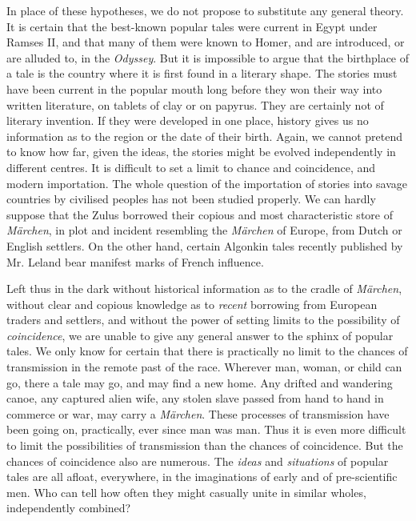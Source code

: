 \documentclass[14pt,a4paper]{memoir}
\begin{document}
In place of these hypotheses, we do not propose to substitute any
general theory. It is certain that the best-known popular tales were
current in Egypt under Ramses II, and that many of them were known to
Homer, and are introduced, or are alluded to, in the \emph{Odyssey}. But
it is impossible to argue that the birthplace of a tale is the country
where it is first found in a literary shape. The stories must have been
current in the popular mouth long before they won their way into written
literature, on tablets of clay or on papyrus. They are certainly not of
literary invention. If they were developed in one place, history gives
us no information as to the region or the date of their birth. Again, we
cannot pretend to know how far, given the ideas, the stories might be
evolved independently in different centres. It is difficult to set a
limit to chance and coincidence, and modern importation. The whole
question of the importation of stories into savage countries by
civilised peoples has not been studied properly. We can hardly suppose
that the Zulus borrowed their copious and most characteristic store of
\emph{Märchen}, in plot and incident resembling the \emph{Märchen} of
Europe, from Dutch or English settlers. On the other hand, certain
Algonkin tales recently published by Mr. Leland bear manifest marks of
French influence.

Left thus in the dark without historical information as to the
\textquotesingle cradle\textquotesingle{} of \emph{Märchen}, without
clear and copious knowledge as to \emph{recent} borrowing from European
traders and settlers, and without the power of setting limits to the
possibility of \emph{coincidence}, we are unable to give any general
answer to the sphinx of popular tales. We only know for certain that
there is practically no limit to the chances of transmission in the
remote past of the race. Wherever man, woman, or child can go, there a
tale may go, and may find a new home. Any drifted and wandering canoe,
any captured alien wife, any stolen slave passed from hand to hand in
commerce or war, may carry a \emph{Märchen}. These processes of
transmission have been going on, practically, ever since man was man.
Thus it is even more difficult to limit the possibilities of
transmission than the chances of coincidence. But the chances of
coincidence also are numerous. The \emph{ideas} and \emph{situations} of
popular tales are all afloat, everywhere, in the imaginations of early
and of pre-scientific men. Who can tell how often they might casually
unite in similar wholes, independently combined?
\end{document}

